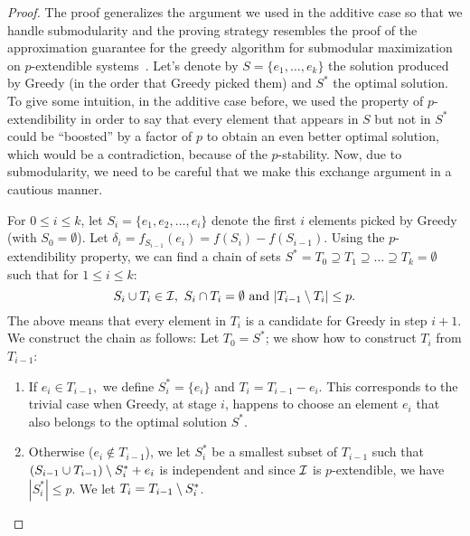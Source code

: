 \begin{proof}
The proof generalizes the argument we used in the additive case so that we handle submodularity and the proving strategy resembles the proof of the approximation guarantee for the greedy algorithm for submodular maximization on $p$-extendible systems~\cite{calinescu2011maximizing}.  Let's denote by $S = \{e_1,\ldots,e_k\}$ the solution produced by Greedy (in the order that Greedy picked them) and $S^*$ the optimal solution. To give some intuition, in the additive case before, we used the property of $p$-extendibility in order to say that every element that appears in $S$ but not in $S^*$ could be ``boosted'' by a factor of $p$ to obtain an even better optimal solution, which would be a contradiction, because of the $p$-stability. Now, due to submodularity, we need to be careful that we make this exchange argument in a cautious manner.

For $0 \leq i \leq k$, let $S_i = \{e_1,e_2,\dots, e_i\}$ denote the first $i$ elements picked by Greedy (with $S_0=\emptyset$). Let $\delta_i = f_{S_{i-1}}(e_i)= f(S_i)-f(S_{i-1})$. %
Using the $p$-extendibility property, we can find a chain of sets $S^* = T_0 \supseteq T_1\supseteq \dots \supseteq T_k = \emptyset$ such that for $1\le i\le k$:
$$S_i\cup T_i \in \mathcal{I},  \ S_i\cap T_i = \emptyset \ \text{and}\ |T_{i-1} \setminus T_{i}| \leq p.$$
The above means that every element in $T_i$ is a candidate for Greedy in step $i+1$. We construct the chain as follows: Let $T_0=S^*$; we show how to construct $T_i$ from $T_{i-1}$:

\begin{enumerate}
\item If $e_i \in T_{i-1},$ we define $S^*_i=\{e_i\}$ and $T_i=T_{i-1}-e_i$. This corresponds to the trivial case when Greedy, at stage $i$, happens to choose an element $e_i$ that also belongs to the optimal solution $S^*$.
\item Otherwise ($e_i \notin T_{i-1}$), we let $S^*_i$ be a smallest subset of $T_{i-1}$ such that $(S_{i-1}\cup T_{i-1})\setminus S^*_i + e_i$ is independent and since $\mathcal{I}$ is $p$-extendible, we have $|S^*_i|\le p$. We let $T_i=T_{i-1}\setminus S^*_i$. 
\end{enumerate}


\end{proof}
